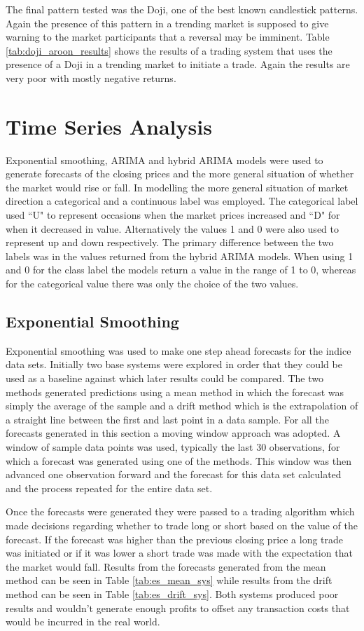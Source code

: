 The final pattern tested was the Doji, one of the best known candlestick patterns. Again the presence of this pattern in a trending market is supposed to give warning to the market participants that a reversal may be imminent. Table \ref{tab:doji_aroon_results} shows the results of a trading system that uses the presence of a Doji in a trending market to initiate a trade. Again the results are very poor with mostly negative returns.

\section{Time Series Analysis}
Exponential smoothing, ARIMA and hybrid ARIMA models were used to generate forecasts of the closing prices and the more general situation of whether the market would rise or fall. In modelling the more general situation of market direction a categorical and a continuous label was employed. The categorical label used \textquotedblleft U" to represent occasions when the market prices increased and \textquotedblleft D" for when it decreased in value. Alternatively the values 1 and 0 were also used to represent up and down respectively. The primary difference between the two labels was in the values returned from the hybrid ARIMA models. When using 1 and 0 for the class label the models return a value in the range of 1 to 0, whereas for the categorical value there was only the choice of the two values. 

\subsection{Exponential Smoothing}
Exponential smoothing was used to make one step ahead forecasts for the indice data sets. Initially two base systems were explored in order that they could be used as a baseline against which later results could be compared. The two methods generated predictions using a mean method in which the forecast was simply the average of the sample and a drift method which is the extrapolation of a straight line between the first and last point in a data sample. For all the forecasts generated in this section a moving window approach was adopted. A window of sample data points was used, typically the last 30 observations, for which a forecast was generated using one of the methods. This window was then advanced one observation forward and the forecast for this data set calculated and the process repeated for the entire data set.

Once the forecasts were generated they were passed to a trading algorithm which made decisions regarding whether to trade long or short based on the value of the forecast. If the forecast was higher than the previous closing price a long trade was initiated or if it was lower a short trade was made with the expectation that the market would fall. Results from the forecasts generated from the mean method can be seen in Table \ref{tab:es_mean_sys} while results from the drift method can be seen in Table \ref{tab:es_drift_sys}. Both systems produced poor results and wouldn't generate enough profits to offset any transaction costs that would be incurred in the real world.

